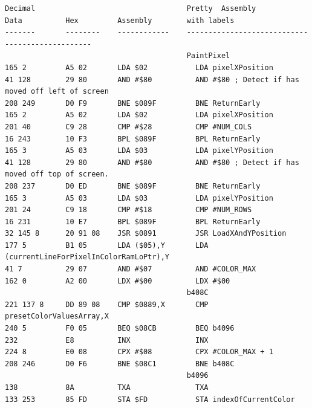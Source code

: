\lstset{style=6502Style}
\begin{lstlisting}[basicstyle=\tiny]
Decimal                                   Pretty  Assembly
Data          Hex         Assembly        with labels
-------       --------    ------------    ------------------------------------------------
                                          PaintPixel                                       
165 2         A5 02       LDA $02           LDA pixelXPosition                               
41 128        29 80       AND #$80          AND #$80 ; Detect if has moved off left of screen
208 249       D0 F9       BNE $089F         BNE ReturnEarly                                  
165 2         A5 02       LDA $02           LDA pixelXPosition                               
201 40        C9 28       CMP #$28          CMP #NUM_COLS                                    
16 243        10 F3       BPL $089F         BPL ReturnEarly                                  
165 3         A5 03       LDA $03           LDA pixelYPosition                               
41 128        29 80       AND #$80          AND #$80 ; Detect if has moved off top of screen.
208 237       D0 ED       BNE $089F         BNE ReturnEarly                                  
165 3         A5 03       LDA $03           LDA pixelYPosition                               
201 24        C9 18       CMP #$18          CMP #NUM_ROWS                                    
16 231        10 E7       BPL $089F         BPL ReturnEarly                                  
32 145 8      20 91 08    JSR $0891         JSR LoadXAndYPosition                            
177 5         B1 05       LDA ($05),Y       LDA (currentLineForPixelInColorRamLoPtr),Y       
41 7          29 07       AND #$07          AND #COLOR_MAX                                   
162 0         A2 00       LDX #$00          LDX #$00                                         
                                          b408C
221 137 8     DD 89 08    CMP $0889,X       CMP presetColorValuesArray,X             
240 5         F0 05       BEQ $08CB         BEQ b4096                                        
232           E8          INX               INX                                              
224 8         E0 08       CPX #$08          CPX #COLOR_MAX + 1                               
208 246       D0 F6       BNE $08C1         BNE b408C                                        
                                          b4096   
138           8A          TXA               TXA                                      
133 253       85 FD       STA $FD           STA indexOfCurrentColor                          

\end{lstlisting}
